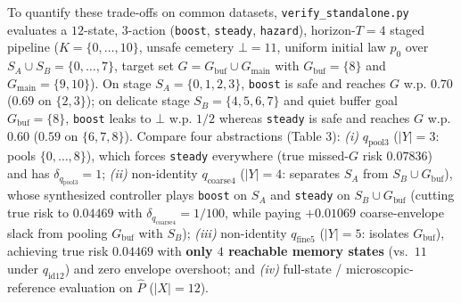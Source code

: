 \documentclass[11pt,a4paper]{article}
\begin{document}
To quantify these trade-offs on common datasets,
\texttt{verify\_standalone.py} evaluates a \(12\)-state, \(3\)-action
(\texttt{boost}, \texttt{steady}, \texttt{hazard}), horizon-\(T=4\)
staged pipeline (\(K = \{0,\dots,10\}\), unsafe cemetery \(\bot = 11\),
uniform initial law \(p_0\) over \(S_A \cup S_B = \{0,\dots,7\}\),
target set \(G = G_{\mathrm{buf}} \cup G_{\mathrm{main}}\) with
\(G_{\mathrm{buf}} = \{8\}\) and \(G_{\mathrm{main}} = \{9,10\}\)). On
stage \(S_A = \{0,1,2,3\}\), \texttt{boost} is safe and reaches \(G\)
w.p. \(0.70\) (\(0.69\) on \(\{2,3\}\)); on delicate stage
\(S_B = \{4,5,6,7\}\) and quiet buffer goal
\(G_{\mathrm{buf}} = \{8\}\), \texttt{boost} leaks to \(\bot\) w.p.
\(1/2\) whereas \texttt{steady} is safe and reaches \(G\) w.p. \(0.60\)
(\(0.59\) on \(\{6,7,8\}\)). Compare four abstractions (Table 3):
\emph{(i)} \(q_{\mathrm{pool3}}\) (\(|Y|=3\): pools \(\{0,\dots,8\}\)),
which forces \texttt{steady} everywhere (true missed-\(G\) risk
\(0.07836\)) and has \(\delta_{q_{\mathrm{pool3}}} = 1\); \emph{(ii)}
non-identity \(q_{\mathrm{coarse4}}\) (\(|Y|=4\): separates \(S_A\) from
\(S_B \cup G_{\mathrm{buf}}\)), whose synthesized controller plays
\texttt{boost} on \(S_A\) and \texttt{steady} on
\(S_B \cup G_{\mathrm{buf}}\) (cutting true risk to \textbf{\(0.04469\)}
with \(\delta_{q_{\mathrm{coarse4}}} = 1/100\), while paying
\(+0.01069\) coarse-envelope slack from pooling \(G_{\mathrm{buf}}\)
with \(S_B\)); \emph{(iii)} non-identity \(q_{\mathrm{fine5}}\)
(\(|Y|=5\): isolates \(G_{\mathrm{buf}}\)), achieving true risk
\textbf{\(0.04469\)} with \textbf{only \(4\) reachable memory states}
(vs.~\(11\) under \(q_{\mathrm{id12}}\)) and zero envelope overshoot;
and \emph{(iv)} full-state / microscopic-reference evaluation on
\(\widehat{P}\) (\(|X|=12\)).

\end{document}
